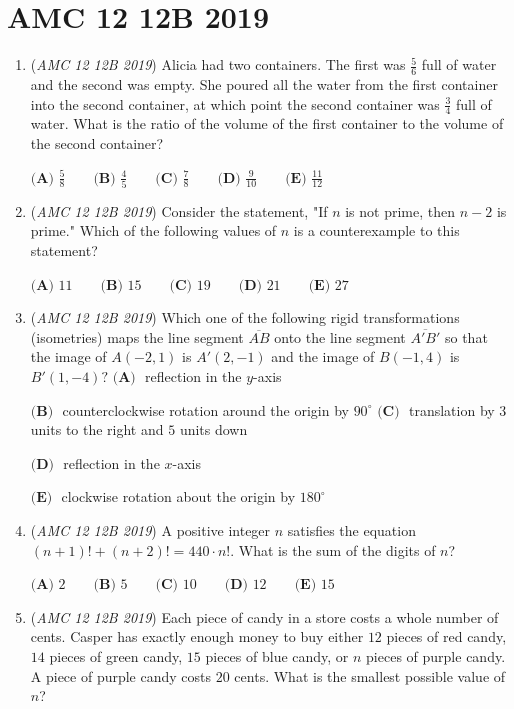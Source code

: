 \section{AMC 12 12B 2019}
        \begin{enumerate}
        	\item (\textit{AMC 12 12B 2019}) Alicia had two containers. The first was $\frac{5}{6}$ full of water and the second was empty. She poured all the water from the first container into the second container, at which point the second container was $\frac{3}{4}$ full of water. What is the ratio of the volume of the first container to the volume of the second container?


 $\textbf{(A) } \frac{5}{8} \qquad \textbf{(B) } \frac{4}{5} \qquad \textbf{(C) } \frac{7}{8} \qquad \textbf{(D) } \frac{9}{10} \qquad \textbf{(E) } \frac{11}{12}$


	\item (\textit{AMC 12 12B 2019}) Consider the statement, "If $n$ is not prime, then $n-2$ is prime." Which of the following values of $n$ is a counterexample to this statement?


 $\textbf{(A) } 11 \qquad \textbf{(B) } 15 \qquad \textbf{(C) } 19 \qquad \textbf{(D) } 21 \qquad \textbf{(E) } 27$


	\item (\textit{AMC 12 12B 2019}) Which one of the following rigid transformations (isometries) maps the line segment $\overline{AB}$ onto the line segment $\overline{A'B'}$ so that the image of $A(-2,1)$ is $A'(2,-1)$ and the image of $B(-1,4)$ is $B'(1,-4)?$
$\textbf{(A) }$ reflection in the $y$-axis


 $\textbf{(B) }$ counterclockwise rotation around the origin by $90^{\circ}$
$\textbf{(C) }$ translation by $3$ units to the right and $5$ units down


 $\textbf{(D) }$ reflection in the $x$-axis


 $\textbf{(E) }$ clockwise rotation about the origin by $180^{\circ}$


	\item (\textit{AMC 12 12B 2019}) A positive integer $n$ satisfies the equation $(n+1)!+(n+2)!=440\cdot n!$. What is the sum of the digits of $n$?


 $\textbf{(A) } 2 \qquad \textbf{(B) } 5 \qquad \textbf{(C) } 10\qquad \textbf{(D) } 12 \qquad \textbf{(E) } 15$


	\item (\textit{AMC 12 12B 2019}) Each piece of candy in a store costs a whole number of cents. Casper has exactly enough money to buy either $12$ pieces of red candy, $14$ pieces of green candy, $15$ pieces of blue candy, or $n$ pieces of purple candy. A piece of purple candy costs $20$ cents. What is the smallest possible value of $n$?



\end{enumerate}
